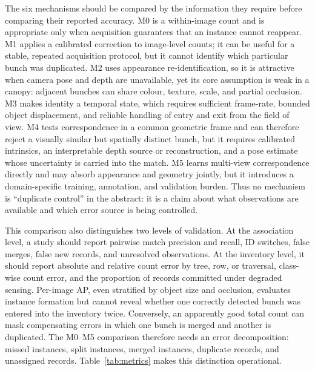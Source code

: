 The six mechanisms should be compared by the information they require before comparing their reported accuracy. M0 is a within-image count and is appropriate only when acquisition guarantees that an instance cannot reappear. M1 applies a calibrated correction to image-level counts; it can be useful for a stable, repeated acquisition protocol, but it cannot identify which particular bunch was duplicated. M2 uses appearance re-identification, so it is attractive when camera pose and depth are unavailable, yet its core assumption is weak in a canopy: adjacent bunches can share colour, texture, scale, and partial occlusion. M3 makes identity a temporal state, which requires sufficient frame-rate, bounded object displacement, and reliable handling of entry and exit from the field of view. M4 tests correspondence in a common geometric frame and can therefore reject a visually similar but spatially distinct bunch, but it requires calibrated intrinsics, an interpretable depth source or reconstruction, and a pose estimate whose uncertainty is carried into the match. M5 learns multi-view correspondence directly and may absorb appearance and geometry jointly, but it introduces a domain-specific training, annotation, and validation burden. Thus no mechanism is ``duplicate control'' in the abstract: it is a claim about what observations are available and which error source is being controlled.

This comparison also distinguishes two levels of validation. At the association level, a study should report pairwise match precision and recall, ID switches, false merges, false new records, and unresolved observations. At the inventory level, it should report absolute and relative count error by tree, row, or traversal, class-wise count error, and the proportion of records committed under degraded sensing. Per-image AP, even stratified by object size and occlusion, evaluates instance formation but cannot reveal whether one correctly detected bunch was entered into the inventory twice. Conversely, an apparently good total count can mask compensating errors in which one bunch is merged and another is duplicated. The M0--M5 comparison therefore needs an error decomposition: missed instances, split instances, merged instances, duplicate records, and unassigned records. Table~\ref{tab:metrics} makes this distinction operational.

